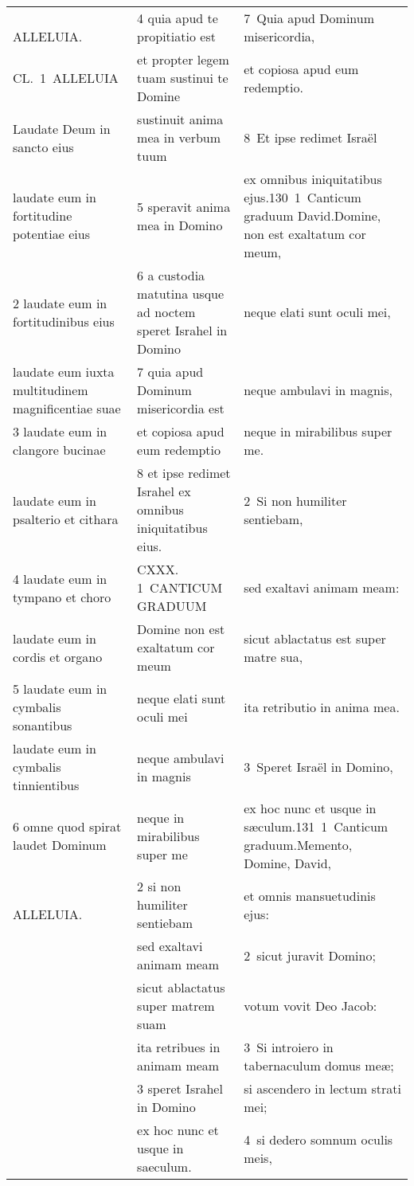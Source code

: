 \documentclass{article}
\begin{document}
\begin{longtable}{@{}p{}p{}p{}@{}}
    ALLELUIA.	&	4 quia apud te propitiatio est	&	7 Quia apud Dominum misericordia,	\\
CL. 1 ALLELUIA	&	et propter legem tuam sustinui te Domine	&	et copiosa apud eum redemptio.	\\
Laudate Deum in sancto eius	&	sustinuit anima mea in verbum tuum	&	8 Et ipse redimet Israël	\\
laudate eum in fortitudine potentiae eius	&	5 speravit anima mea in Domino	&	ex omnibus iniquitatibus ejus.130 1 Canticum graduum David.Domine, non est exaltatum cor meum,	\\
2 laudate eum in fortitudinibus eius	&	6 a custodia matutina usque ad noctem speret Israhel in Domino	&	neque elati sunt oculi mei,	\\
laudate eum iuxta multitudinem magnificentiae suae	&	7 quia apud Dominum misericordia est	&	neque ambulavi in magnis,	\\
3 laudate eum in clangore bucinae	&	et copiosa apud eum redemptio	&	neque in mirabilibus super me.	\\
laudate eum in psalterio et cithara	&	8 et ipse redimet Israhel ex omnibus iniquitatibus eius.	&	2 Si non humiliter sentiebam,	\\
4 laudate eum in tympano et choro	&	CXXX. 1 CANTICUM GRADUUM	&	sed exaltavi animam meam:	\\
laudate eum in cordis et organo	&	Domine non est exaltatum cor meum	&	sicut ablactatus est super matre sua,	\\
5 laudate eum in cymbalis sonantibus	&	neque elati sunt oculi mei	&	ita retributio in anima mea.	\\
laudate eum in cymbalis tinnientibus	&	neque ambulavi in magnis	&	3 Speret Israël in Domino,	\\
6 omne quod spirat laudet Dominum	&	neque in mirabilibus super me	&	ex hoc nunc et usque in sæculum.131 1 Canticum graduum.Memento, Domine, David,	\\
    ALLELUIA.	&	2 si non humiliter sentiebam	&	et omnis mansuetudinis ejus:	\\
	&	sed exaltavi animam meam	&	2 sicut juravit Domino;	\\
	&	sicut ablactatus super matrem suam	&	votum vovit Deo Jacob:	\\
	&	ita retribues in animam meam	&	3 Si introiero in tabernaculum domus meæ;	\\
	&	3 speret Israhel in Domino	&	si ascendero in lectum strati mei;	\\
	&	ex hoc nunc et usque in saeculum.	&	4 si dedero somnum oculis meis,	\\

\end{longtable}
\end{document}
